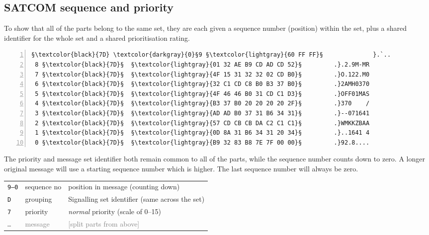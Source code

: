 \documentclass[tikz,a4paper,12pt]{article}
\begin{document}
\clearpage
\subsection{SATCOM sequence and priority}

To show that all of the parts belong to the same set, they are each
given a sequence number (position) within the set, plus a shared identifier for the whole
set and a shared prioritisation rating.

\begin{lstlisting}[language=SATCOM,numbers=left]
                §\textcolor{black}{7D} \textcolor{darkgray}{0}§9 §\textcolor{lightgray}{60 FF FF}§              }.`..
 8 §\textcolor{black}{7D}§  §\textcolor{lightgray}{01 32 AE B9 CD AD CD 52}§         .}.2.9M-MR
 7 §\textcolor{black}{7D}§  §\textcolor{lightgray}{4F 15 31 32 32 02 CD B0}§         .}O.122.M0
 6 §\textcolor{black}{7D}§  §\textcolor{lightgray}{32 C1 CD C8 B0 B3 37 B0}§         .}2AMH0370
 5 §\textcolor{black}{7D}§  §\textcolor{lightgray}{4F 46 46 B0 31 CD C1 D3}§         .}OFF01MAS
 4 §\textcolor{black}{7D}§  §\textcolor{lightgray}{B3 37 B0 20 20 20 20 2F}§         .}370    /
 3 §\textcolor{black}{7D}§  §\textcolor{lightgray}{AD AD B0 37 31 B6 34 31}§         .}--071641
 2 §\textcolor{black}{7D}§  §\textcolor{lightgray}{57 CD CB CB DA C2 C1 C1}§         .}WMKKZBAA
 1 §\textcolor{black}{7D}§  §\textcolor{lightgray}{0D 8A 31 B6 34 31 20 34}§         .}..1641 4
 0 §\textcolor{black}{7D}§  §\textcolor{lightgray}{B9 32 83 B8 7E 7F 00 00}§         .}92.8....
\end{lstlisting}

The priority and message set identifier both remain common to all of
the parts, while the sequence number counts down to zero.  A longer
original message will use a starting sequence number which is higher.  The last sequence number will always be zero.

\begin{center}
\begin{tabular}{p{1.5cm}p{2cm}p{8cm}}
\hfill\texttt{9--0}&sequence no&position in message (counting down)\\
\hfill\texttt{D}&grouping&Signalling set identifier (same across the set)\\
\hfill\texttt{7}&priority&\emph{normal} priority (scale of 0--15)\\
\hline
\hfill\textcolor{gray}{\texttt{\ldots}}&\textcolor{gray}{message}&\textcolor{gray}{[split parts from above]}\\
\end{tabular}
\end{center}
\end{document}
